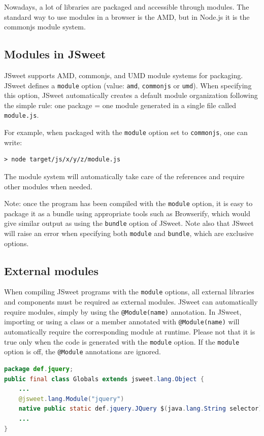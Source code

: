 \documentclass[a4paper]{report}
\begin{document}
Nowadays, a lot of libraries are packaged and accessible through modules. The standard way to use modules in a browser is the AMD, but in Node.js it is the commonjs module system.

\subsection{Modules in JSweet}

JSweet supports AMD, commonjs, and UMD module systems for packaging. JSweet defines a \texttt{module} option (value: \texttt{amd}, \texttt{commonjs} or \texttt{umd}). When specifying this option, JSweet automatically creates a default module organization following the simple rule: one package = one module generated in a single file called \texttt{module.js}. 

For example, when packaged with the \texttt{module} option set to \texttt{commonjs}, one can write:

\begin{lstlisting}[language=html]
> node target/js/x/y/z/module.js
\end{lstlisting}

The module system will automatically take care of the references and require other modules when needed.

Note: once the program has been compiled with the \texttt{module} option, it is easy to package it as a bundle using appropriate tools such as Browserify, which would give similar output as using the \texttt{bundle} option of JSweet. Note also that JSweet will raise an error when specifying both \texttt{module} and \texttt{bundle}, which are exclusive options.

\subsection{External modules}

When compiling JSweet programs with the \texttt{module} options, all external libraries and components must be required as external modules. JSweet can automatically require modules, simply by using the \texttt{@Module(name)} annotation. In JSweet, importing or using a class or a member annotated with \texttt{@Module(name)} will automatically require the corresponding module at runtime. Please not that it is true only when the code is generated with the \texttt{module} option. If the \texttt{module} option is off, the \texttt{@Module} annotations are ignored.

\begin{lstlisting}[language=Java]
package def.jquery;
public final class Globals extends jsweet.lang.Object {
	...
	@jsweet.lang.Module("jquery")
	native public static def.jquery.JQuery $(java.lang.String selector);
	...
}
\end{lstlisting}
\end{document}
